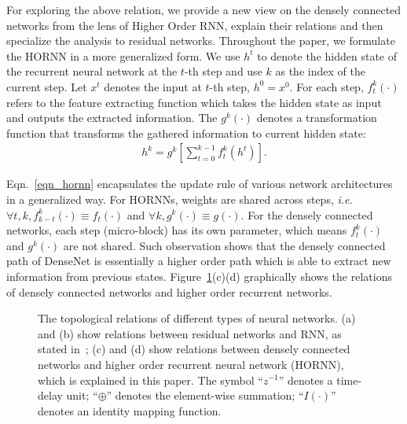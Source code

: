 \documentclass{article}
\begin{document}
For exploring the above relation, we provide a new view on the densely connected networks from the lens of Higher Order RNN, explain their relations and then specialize the analysis to residual networks. Throughout the paper, we formulate the HORNN in a more generalized form. We use $h^t$ to denote the hidden state of the recurrent neural network at the $t$-th step and use $k$ as the index of the current step. Let $x^t$ denotes the input at $t$-th step, $h^0=x^0$. For each step, $f_t^k(\cdot)$ refers to the feature extracting function which takes the hidden state as input and outputs the extracted information. The $g^k(\cdot)$ denotes a transformation function that transforms the gathered information to current hidden state: 
\begin{equation} 
\label{eqn_hornn}
\begin{aligned}
h^k = g^k\left[\sum\limits_{t=0}^{k-1} f_t^k(h^{t})\right]
\text{.}
\end{aligned}
\end{equation}


Eqn.~\eqref{eqn_hornn} encapsulates the update rule of various network architectures in a generalized way. For HORNNs, weights are shared across steps, \emph{i.e.} $\forall t,k, f_{k-t}^k(\cdot) \equiv f_{t}(\cdot)$ and $\forall k, g^k(\cdot) \equiv g(\cdot)$. For the densely connected networks, each step (micro-block) has its own parameter, which means $f_t^k(\cdot)$ and $g^k(\cdot)$ are not shared. Such observation shows that the densely connected path of DenseNet is essentially a higher order path which is able to extract new information from previous states. Figure~\ref{fig_rnn}(c)(d) graphically shows the relations of densely connected networks and higher order recurrent networks.


\begin{figure}[t]	
	\center
  	\vskip -0.08in	
	\caption{The topological relations of different types of neural networks. (a) and (b) show relations between residual networks and RNN, as stated in~\citep{liao2016bridging}; (c) and (d) show relations between densely connected networks and higher order recurrent neural network (HORNN), which is explained in this paper. The symbol ``$z^{-1}$'' denotes a time-delay unit; ``$\oplus$'' denotes the element-wise summation; ``$I(\cdot)$'' denotes an identity mapping function.}
	\label{fig_rnn}
	\vskip -0.1in
\end{figure}
\end{document}
